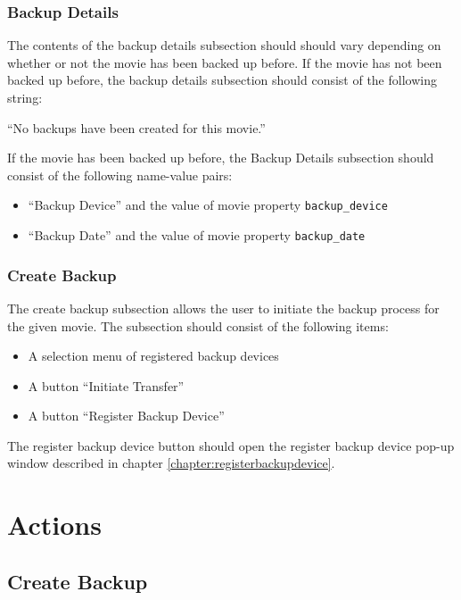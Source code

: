\subsubsection{Backup Details}

The contents of the backup details subsection should should vary depending on 
whether or not the movie has been backed up before. If the movie has not been 
backed up before, the backup details subsection should consist of the following
string: 

\vspace{3mm}
``No backups have been created for this movie.''
\vspace{3mm}

\noindent If the movie has been backed up before, the Backup Details subsection
should consist of the following name-value pairs:

\begin{itemize}\itemsep1pt
  \item ``Backup Device'' and the value of movie property \texttt{backup\_device}
  \item ``Backup Date'' and the value of movie property \texttt{backup\_date}
\end{itemize}

\subsubsection{Create Backup}

The create backup subsection allows the user to initiate the backup process for
the given movie. The subsection should consist of the following items:

\begin{itemize}\itemsep1pt
  \item A selection menu of registered backup devices
  \item A button ``Initiate Transfer''
  \item A button ``Register Backup Device''
\end{itemize}

\noindent The register backup device button should open the register backup device
pop-up window described in chapter \ref{chapter:registerbackupdevice}.

\section{Actions}

\subsection{Create Backup}

